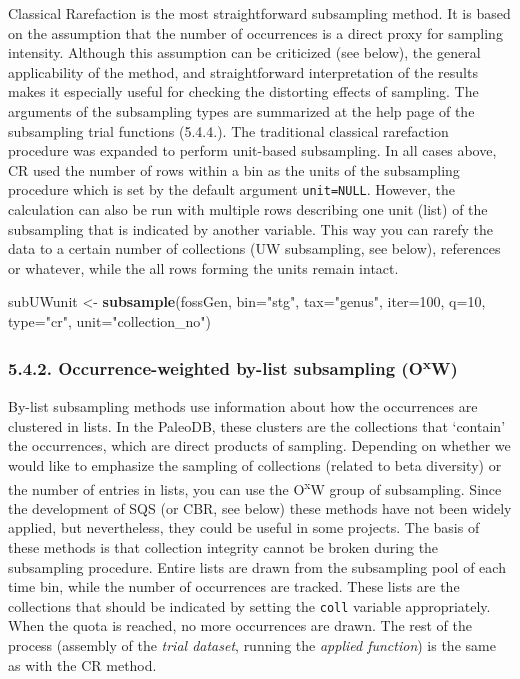 \documentclass[]{article}
\newenvironment{Shaded}{\begin{snugshade}}{\end{snugshade}}
\newcommand{\KeywordTok}[1]{\textcolor[rgb]{0.13,0.29,0.53}{\textbf{{#1}}}}
\newcommand{\DataTypeTok}[1]{\textcolor[rgb]{0.13,0.29,0.53}{{#1}}}
\newcommand{\DecValTok}[1]{\textcolor[rgb]{0.00,0.00,0.81}{{#1}}}
\newcommand{\StringTok}[1]{\textcolor[rgb]{0.31,0.60,0.02}{{#1}}}
\newcommand{\NormalTok}[1]{{#1}}
\begin{document}
Classical Rarefaction is the most straightforward subsampling method. It
is based on the assumption that the number of occurrences is a direct
proxy for sampling intensity. Although this assumption can be criticized
(see below), the general applicability of the method, and
straightforward interpretation of the results makes it especially useful
for checking the distorting effects of sampling. The arguments of the
subsampling types are summarized at the help page of the subsampling
trial functions (5.4.4.). The traditional classical rarefaction
procedure was expanded to perform unit-based subsampling. In all cases
above, CR used the number of rows within a bin as the units of the
subsampling procedure which is set by the default argument
\texttt{unit=NULL}. However, the calculation can also be run with
multiple rows describing one unit (list) of the subsampling that is
indicated by another variable. This way you can rarefy the data to a
certain number of collections (UW subsampling, see below), references or
whatever, while the all rows forming the units remain intact.

\begin{Shaded}
\begin{Highlighting}[]
\NormalTok{subUWunit <-}\StringTok{ }\KeywordTok{subsample}\NormalTok{(fossGen, }\DataTypeTok{bin=}\StringTok{"stg"}\NormalTok{, }\DataTypeTok{tax=}\StringTok{"genus"}\NormalTok{, }
  \DataTypeTok{iter=}\DecValTok{100}\NormalTok{, }\DataTypeTok{q=}\DecValTok{10}\NormalTok{, }\DataTypeTok{type=}\StringTok{"cr"}\NormalTok{, }\DataTypeTok{unit=}\StringTok{"collection_no"}\NormalTok{)}
\end{Highlighting}
\end{Shaded}

\subsubsection{\texorpdfstring{5.4.2. Occurrence-weighted by-list
subsampling
(O\textsuperscript{x}W)}{5.4.2. Occurrence-weighted by-list subsampling (OxW)}}\label{occurrence-weighted-by-list-subsampling-oxw}

By-list subsampling methods use information about how the occurrences
are clustered in lists. In the PaleoDB, these clusters are the
collections that `contain' the occurrences, which are direct products of
sampling. Depending on whether we would like to emphasize the sampling
of collections (related to beta diversity) or the number of entries in
lists, you can use the O\textsuperscript{x}W group of subsampling. Since
the development of SQS (or CBR, see below) these methods have not been
widely applied, but nevertheless, they could be useful in some projects.
The basis of these methods is that collection integrity cannot be broken
during the subsampling procedure. Entire lists are drawn from the
subsampling pool of each time bin, while the number of occurrences are
tracked. These lists are the collections that should be indicated by
setting the \texttt{coll} variable appropriately. When the quota is
reached, no more occurrences are drawn. The rest of the process
(assembly of the \emph{trial dataset}, running the \emph{applied
function}) is the same as with the CR method.
\end{document}
